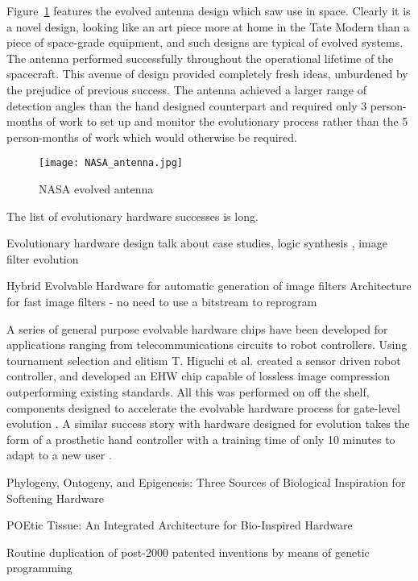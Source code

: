 Figure~\ref{fig:antenna} features the evolved antenna design which
saw use in space. Clearly it is a novel design, looking like an art piece
more at home in the Tate Modern than a piece of space-grade equipment, and such
designs are typical of evolved systems. The antenna performed successfully
throughout the operational lifetime of the spacecraft. This avenue of design
provided completely fresh ideas, unburdened by the prejudice of previous
success. The antenna achieved a larger range of detection angles than the
hand designed counterpart and required only 3 person-months of work to set up and
monitor the evolutionary process rather than the 5 person-months of work which
would otherwise be required.

\begin{figure}
	\centering
	\texttt{[image: NASA\_antenna.jpg]}
	\caption{NASA evolved antenna \cite{Antenna}}
	\label{fig:antenna}
\end{figure}

The list of evolutionary hardware successes is long.

\todo Evolutionary hardware design \cite{Sekanina}
talk about case studies, logic synthesis \cite{Vasicek2011}, image filter evolution

\todo Hybrid Evolvable Hardware for automatic generation of image filters \cite{HybridFilter}
Architecture for fast image filters - no need to use a bitstream to reprogram

A series of general purpose evolvable hardware chips have been developed for
applications ranging from telecommunications circuits to robot controllers.
Using tournament selection and elitism T. Higuchi et al. created a sensor
driven robot controller, and developed an EHW chip capable of lossless image
compression outperforming existing standards. All this was performed on off
the shelf, components designed to accelerate the evolvable hardware process
for gate-level evolution \cite{HiguchiRW}. A similar success story with hardware
designed for evolution takes the form of a prosthetic hand controller with
a training time of only 10 minutes to adapt to a new user \cite{Kajitani1999AnEH}.

\todo Phylogeny, Ontogeny, and Epigenesis: Three Sources of Biological Inspiration for Softening Hardware

\todo POEtic Tissue: An Integrated Architecture for Bio-Inspired Hardware

\todo Routine duplication of post-2000 patented inventions by means of genetic programming

